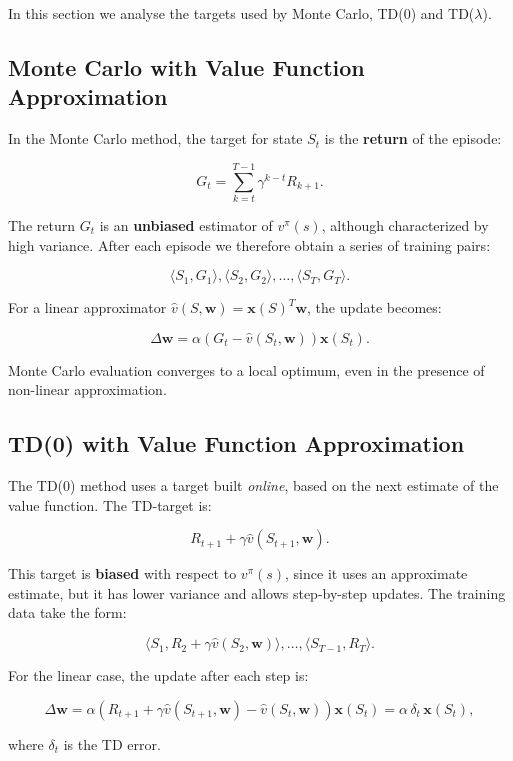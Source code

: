 In this section we analyse the targets used by Monte Carlo, TD(0) and TD($\lambda$).

\subsection{Monte Carlo with Value Function Approximation}

In the Monte Carlo method, the target for state $S_t$ is the \textbf{return} of the episode:

\[
G_t = \sum_{k=t}^{T-1} \gamma^{k-t} R_{k+1}.
\]

The return $G_t$ is an \textbf{unbiased} estimator of $v^\pi(s)$, although characterized by high variance.
After each episode we therefore obtain a series of training pairs:

\[
\langle S_1, G_1 \rangle, \langle S_2, G_2 \rangle, \dots, \langle S_T, G_T \rangle.
\]

For a linear approximator $\hat{v}(S,\mathbf{w}) = \mathbf{x}(S)^T \mathbf{w}$, the update becomes:

\[
\Delta \mathbf{w}
=
\alpha \left( G_t - \hat{v}(S_t,\mathbf{w}) \right) \mathbf{x}(S_t).
\]

Monte Carlo evaluation converges to a local optimum, even in the presence of non-linear approximation.

\subsection{TD(0) with Value Function Approximation}

The TD(0) method uses a target built \textit{online}, based on the next estimate of the value function.
The TD-target is:

\[
R_{t+1} + \gamma \hat{v}(S_{t+1}, \mathbf{w}).
\]

This target is \textbf{biased} with respect to $v^\pi(s)$, since it uses an approximate estimate, but it has lower variance and allows step-by-step updates.
The training data take the form:

\[
\langle S_1, R_2 + \gamma \hat{v}(S_2,\mathbf{w}) \rangle,
\dots,
\langle S_{T-1}, R_T \rangle.
\]

For the linear case, the update after each step is:

\[
\Delta \mathbf{w}
=
\alpha \left( R_{t+1} + \gamma \hat{v}(S_{t+1},\mathbf{w}) - \hat{v}(S_t,\mathbf{w}) \right)
\mathbf{x}(S_t)
=
\alpha \, \delta_t \, \mathbf{x}(S_t),
\]

where $\delta_t$ is the TD error.

